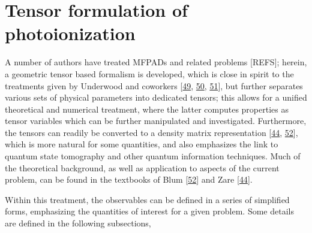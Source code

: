 \documentclass[letterpaper,table,10pt,english]{jupyterBook}
\begin{document}
\sphinxstepscope


\section{Tensor formulation of photoionization}
\label{\detokenize{part1/theory_tensor_formalism_201122:tensor-formulation-of-photoionization}}\label{\detokenize{part1/theory_tensor_formalism_201122:sec-tensor-formulation}}\label{\detokenize{part1/theory_tensor_formalism_201122::doc}}
\sphinxAtStartPar
A number of authors have treated MFPADs and related problems {[}REFS{]}; herein, a geometric tensor based formalism is developed, which is close in spirit to the treatments given by Underwood and co\sphinxhyphen{}workers {[}\hyperlink{cite.backmatter/bibliography:id756}{49}, \hyperlink{cite.backmatter/bibliography:id698}{50}, \hyperlink{cite.backmatter/bibliography:id785}{51}{]}, but further separates various sets of physical parameters into dedicated tensors; this allows for a unified theoretical and numerical treatment, where the latter computes properties as tensor variables which can be further manipulated and investigated. Furthermore, the tensors can readily be converted to a density matrix representation {[}\hyperlink{cite.backmatter/bibliography:id824}{44}, \hyperlink{cite.backmatter/bibliography:id444}{52}{]}, which is more natural for some quantities, and also emphasizes the link to quantum state tomography and other quantum information techniques. Much of the theoretical background, as well as application to aspects of the current problem, can be found in the textbooks of Blum {[}\hyperlink{cite.backmatter/bibliography:id444}{52}{]}
and Zare {[}\hyperlink{cite.backmatter/bibliography:id824}{44}{]}.

\sphinxAtStartPar
Within this treatment, the observables can be defined in a series of simplified forms, emphasizing the quantities of interest for a given problem. Some details are defined in the following subsections,
\end{document}

